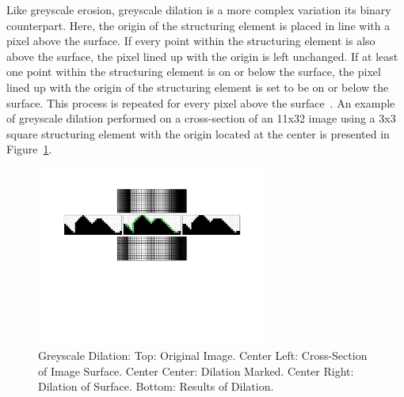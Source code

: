 \documentclass{sig-alternate}
\begin{document}
Like greyscale erosion, greyscale dilation is a more complex variation its binary counterpart. Here, the origin of the structuring element is placed in line with a pixel above the surface. If every point within the structuring element is also above the surface, the pixel lined up with the origin is left unchanged. If at least one point within the structuring element is on or below the surface, the pixel lined up with the origin of the structuring element is set to be on or below the surface. This process is repeated for every pixel above the surface~\cite{MorphologyPaper:1987, MorphologyWiki}. An example of greyscale dilation performed on a cross-section of an 11x32 image using a 3x3 square structuring element with the origin located at the center is presented in Figure~\ref{greyscale dilation figure}.
\begin{figure}
\centering
\includegraphics[width=3in,trim={0 4in 0 0},clip]{greyscale_dilation}
\caption{Greyscale Dilation: Top: Original Image. Center Left: Cross-Section of Image Surface. Center Center: Dilation Marked. Center Right: Dilation of Surface. Bottom: Results of Dilation.}
\label{greyscale dilation figure}
\end{figure}
\end{document}
